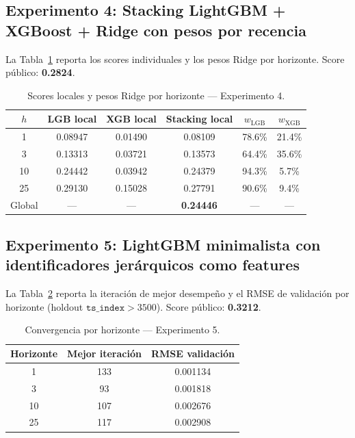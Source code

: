 \documentclass{article}
\begin{document}
\subsection{Experimento 4: Stacking LightGBM + XGBoost + Ridge con pesos por recencia}

La Tabla~\ref{tab:stacking_scores} reporta los scores individuales y los pesos Ridge por horizonte. Score público: \textbf{0.2824}.

\begin{table}[h!]
  \caption{Scores locales y pesos Ridge por horizonte — Experimento 4.}
  \label{tab:stacking_scores}
  \centering
  \begin{tabular}{cccccc}
    \toprule
    $h$ & LGB local & XGB local & Stacking local & $w_{\text{LGB}}$ & $w_{\text{XGB}}$ \\
    \midrule
    1  & 0.08947 & 0.01490 & 0.08109 & 78.6\% & 21.4\% \\
    3  & 0.13313 & 0.03721 & 0.13573 & 64.4\% & 35.6\% \\
    10 & 0.24442 & 0.03942 & 0.24379 & 94.3\% &  5.7\% \\
    25 & 0.29130 & 0.15028 & 0.27791 & 90.6\% &  9.4\% \\
    \midrule
    Global & --- & --- & \textbf{0.24446} & --- & --- \\
    \bottomrule
  \end{tabular}
\end{table}

\subsection{Experimento 5: LightGBM minimalista con identificadores jerárquicos como features}

La Tabla~\ref{tab:exp5_conv} reporta la iteración de mejor desempeño y el RMSE de validación por horizonte (holdout $\texttt{ts\_index} > 3500$). Score público: \textbf{0.3212}.

\begin{table}[h!]
  \caption{Convergencia por horizonte — Experimento 5.}
  \label{tab:exp5_conv}
  \centering
  \begin{tabular}{ccc}
    \toprule
    Horizonte & Mejor iteración & RMSE validación \\
    \midrule
    1  & 133 & 0.001134 \\
    3  &  93 & 0.001818 \\
    10 & 107 & 0.002676 \\
    25 & 117 & 0.002908 \\
    \bottomrule
  \end{tabular}
\end{table}
\end{document}
